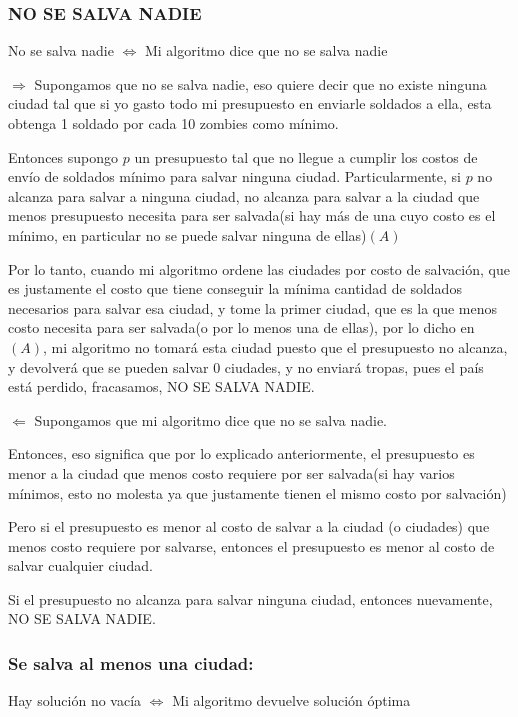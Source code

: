 \subsubsection{ NO SE SALVA NADIE}

No se salva nadie $\Longleftrightarrow$ Mi algoritmo dice que no se salva nadie

$\Longrightarrow$ Supongamos que no se salva nadie, eso quiere decir que no existe ninguna ciudad tal que si yo gasto todo mi presupuesto en enviarle soldados a ella, esta obtenga 1 soldado por cada 10 zombies como mínimo.

Entonces supongo $p$ un presupuesto tal que no llegue a cumplir los costos de envío de soldados mínimo para salvar ninguna ciudad.
Particularmente, si $p$ no alcanza para salvar a ninguna ciudad, no alcanza para salvar a la ciudad que menos presupuesto necesita para ser salvada(si hay más de una cuyo costo es el mínimo, en particular no se puede salvar ninguna de ellas)$(A)$

Por lo tanto, cuando mi algoritmo ordene las ciudades por costo de salvación, que es justamente el costo que tiene conseguir la mínima cantidad de soldados necesarios para salvar esa ciudad, y tome la primer ciudad, que es la que menos costo necesita para ser salvada(o por lo menos una de ellas), por lo dicho en $(A)$, mi algoritmo no tomará esta ciudad puesto que el presupuesto no alcanza, y devolverá que se pueden salvar 0 ciudades, y no enviará tropas, pues el país está perdido, fracasamos, NO SE SALVA NADIE.

$\Longleftarrow$ Supongamos que mi algoritmo dice que no se salva nadie.

Entonces, eso significa que por lo explicado anteriormente, el presupuesto es menor a la ciudad que menos costo requiere por ser salvada(si hay varios mínimos, esto no molesta ya que justamente tienen el mismo costo por salvación)

Pero si el presupuesto es menor al costo de salvar a la ciudad (o ciudades) que menos costo requiere por salvarse, entonces el presupuesto es menor al costo de salvar cualquier ciudad.

Si el presupuesto no alcanza para salvar ninguna ciudad, entonces nuevamente, NO SE SALVA NADIE.

\subsubsection{Se salva al menos una ciudad:}

Hay solución no vacía $\Longleftrightarrow$ Mi algoritmo devuelve solución óptima

